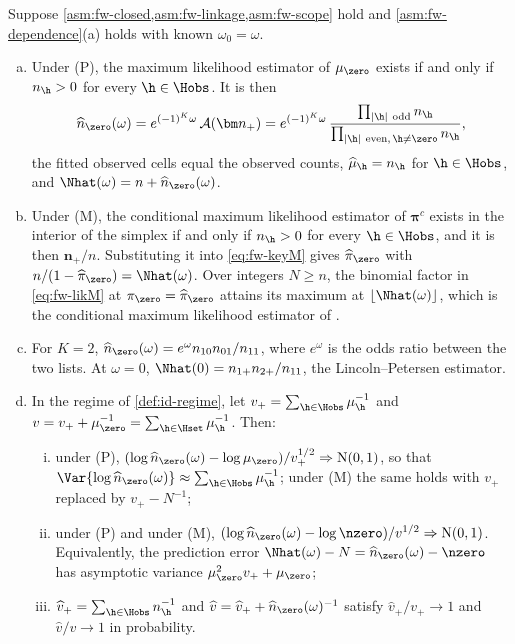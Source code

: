 \begin{theorem}\label{thm:closed}
Suppose \cref{asm:fw-closed,asm:fw-linkage,asm:fw-scope} hold and \cref{asm:fw-dependence}(a) holds with known $\omega_0=\omega$.
\begin{enumerate}[(a)]
  \item Under (P), the maximum likelihood estimator of $\mu_{\zero}$ exists if and only if $n_{\h}>0$ for every $\h\in\Hobs$. It is then
  \begin{equation}\label{eq:id-closed}
    \widehat n_{\zero}(\omega)=e^{(-1)^K\omega}\,\mathcal A(\bm n_+)
    =e^{(-1)^K\omega}\,\frac{\prod_{|\h|\ \mathrm{odd}}n_{\h}}{\prod_{|\h|\ \mathrm{even},\,\h\neq\zero}n_{\h}},
  \end{equation}
  the fitted observed cells equal the observed counts, $\widehat\mu_{\h}=n_{\h}$ for $\h\in\Hobs$, and $\Nhat(\omega)=n+\widehat n_{\zero}(\omega)$.
  \item Under (M), the conditional maximum likelihood estimator of $\bm\pi^c$ exists in the interior of the simplex if and only if $n_{\h}>0$ for every $\h\in\Hobs$, and it is then $\bm n_+/n$. Substituting it into \eqref{eq:fw-keyM} gives $\widehat\pi_{\zero}$ with $n/(1-\widehat\pi_{\zero})=\Nhat(\omega)$. Over integers $N\ge n$, the binomial factor in \eqref{eq:fw-likM} at $\pi_{\zero}=\widehat\pi_{\zero}$ attains its maximum at $\lfloor\Nhat(\omega)\rfloor$, which is the conditional maximum likelihood estimator of \citet{sanathanan1972}.
  \item For $K=2$, $\widehat n_{\zero}(\omega)=e^{\omega}n_{10}n_{01}/n_{11}$, where $e^\omega$ is the odds ratio between the two lists. At $\omega=0$, $\Nhat(0)=n_{1+}n_{2+}/n_{11}$, the Lincoln--Petersen estimator.
  \item In the regime of \cref{def:id-regime}, let $v_+=\sum_{\h\in\Hobs}\mu_{\h}^{-1}$ and $v=v_++\mu_{\zero}^{-1}=\sum_{\h\in\Hset}\mu_{\h}^{-1}$. Then:
  \begin{enumerate}[(i)]
    \item under (P), $(\log\widehat n_{\zero}(\omega)-\log\mu_{\zero})/v_+^{1/2}\Rightarrow\mathrm N(0,1)$, so that $\Var\{\log\widehat n_{\zero}(\omega)\}\approx\sum_{\h\in\Hobs}\mu_{\h}^{-1}$; under (M) the same holds with $v_+$ replaced by $v_+-N^{-1}$;
    \item under (P) and under (M), $(\log\widehat n_{\zero}(\omega)-\log\nzero)/v^{1/2}\Rightarrow\mathrm N(0,1)$. Equivalently, the prediction error $\Nhat(\omega)-N=\widehat n_{\zero}(\omega)-\nzero$ has asymptotic variance $\mu_{\zero}^2v_++\mu_{\zero}$;
    \item $\widehat v_+=\sum_{\h\in\Hobs}n_{\h}^{-1}$ and $\widehat v=\widehat v_++\widehat n_{\zero}(\omega)^{-1}$ satisfy $\widehat v_+/v_+\to1$ and $\widehat v/v\to1$ in probability.
  \end{enumerate}
\end{enumerate}
\end{theorem}

